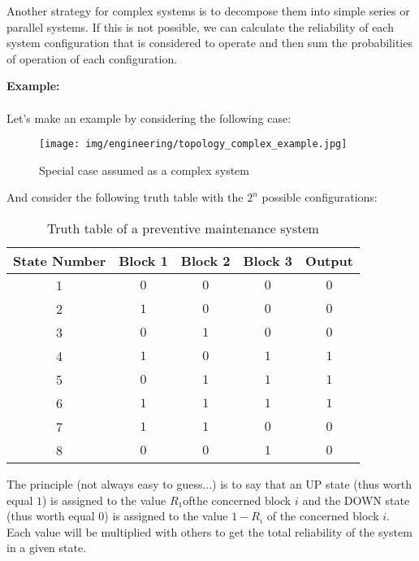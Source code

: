 	Another strategy for complex systems is to decompose them into simple series or parallel systems. If this is not possible, we can calculate the reliability of each system configuration that is considered to operate and then sum the probabilities of operation of each configuration.
	\begin{tcolorbox}[colframe=black,colback=white,sharp corners]
		\textbf{{\Large {}}Example:}\\\\
		Let's make an example by considering the following case:
		\begin{figure}[H]
			\begin{center}
				\texttt{[image: img/engineering/topology\_complex\_example.jpg]}
			\end{center}	
			\caption[]{Special case assumed as a complex system}
		\end{figure}
		And consider the following truth table with the $2^n$ possible configurations:
	\end{tcolorbox}
	\begin{table}[H]\centering
	\begin{center}
			\begin{tabular}{|c|c|c|c|c|}
				\hline
				\multicolumn{1}{c}{\cellcolor{black!30}\textbf{State Number}} & 
  \multicolumn{1}{c}{\cellcolor{black!30}\textbf{Block 1}} & 
  \multicolumn{1}{c}{\cellcolor{black!30}\textbf{Block 2}} & 
  \multicolumn{1}{c}{\cellcolor{black!30}\textbf{Block 3}} & 
  \multicolumn{1}{c}{\cellcolor{black!30}\textbf{Output}}\\ \hline
				 1 & $0$ & $0$ & $0$ & $0$\\ \hline
				 2 & $1$ & $0$ & $0$ & $0$\\ \hline
				 3 & $0$ & $1$ & $0$ & $0$\\ \hline
				 4 & $1$ & $0$ & $1$ & $1$\\ \hline
				 5 & $0$ & $1$ & $1$ & $1$\\ \hline
				 6 & $1$ & $1$ & $1$ & $1$\\ \hline
				 7 & $1$ & $1$ & $0$ & $0$\\ \hline
				 8 & $0$ & $0$ & $1$ & $0$ \\ \hline
		\end{tabular}
	\end{center}
	\caption[]{Truth table of a preventive maintenance system}
	\end{table}
	The principle (not always easy to guess...) is to say that an UP state (thus worth equal $1$) is assigned to the value $R_1$ofthe concerned block $i$ and the DOWN state (thus worth equal $0$) is assigned to the value $1-R_i$ of the concerned block $i$. Each value will be multiplied with others to get the total reliability of the system in a given state.
	
